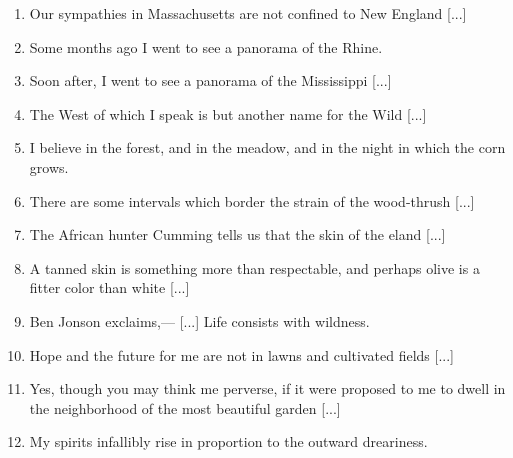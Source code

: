\documentclass[twoside,openright,10pt]{memoir} %
\begin{document}
\begin{enumerate}
\item Our sympathies in Massachusetts are not confined to New England [...] \EBGaramond{}\textlangle\normalfont {} \thecount \EBGaramond{}\textrangle \normalfont
\item Some months ago I went to see a panorama of the Rhine. \EBGaramond{}\textlangle\normalfont {} \thecount \EBGaramond{}\textrangle \normalfont
\item Soon after, I went to see a panorama of the Mississippi [...] \EBGaramond{}\textlangle\normalfont {} \thecount \EBGaramond{}\textrangle \normalfont
\item The West of which I speak is but another name for the Wild [...] \EBGaramond{}\textlangle\normalfont {} \thecount \EBGaramond{}\textrangle \normalfont
\item I believe in the forest, and in the meadow, and in the night in which the corn grows. \EBGaramond{}\textlangle\normalfont {} \thecount \EBGaramond{}\textrangle \normalfont
\item There are some intervals which border the strain of the wood-thrush [...] \EBGaramond{}\textlangle\normalfont {} \thecount \EBGaramond{}\textrangle \normalfont
\item The African hunter Cumming tells us that the skin of the eland [...] \EBGaramond{}\textlangle\normalfont {} \thecount \EBGaramond{}\textrangle \normalfont
\item A tanned skin is something more than respectable, and perhaps olive is a fitter color than white [...] \EBGaramond{}\textlangle\normalfont {} \thecount \EBGaramond{}\textrangle \normalfont
\item Ben Jonson exclaims,— [...] Life consists with wildness. \newline \EBGaramond{}\textlangle\normalfont {} \thecount \EBGaramond{}\textrangle \normalfont
\item Hope and the future for me are not in lawns and cultivated fields [...] \EBGaramond{}\textlangle\normalfont {} \thecount \EBGaramond{}\textrangle \normalfont
\item Yes, though you may think me perverse, if it were proposed to me to dwell in the neighborhood of the most beautiful garden [...] \EBGaramond{}\textlangle\normalfont {} \thecount \EBGaramond{}\textrangle \normalfont
\item My spirits infallibly rise in proportion to the outward dreariness. \EBGaramond{}\textlangle\normalfont {} \thecount \EBGaramond{}\textrangle \normalfont

\end{enumerate}
\end{document}
